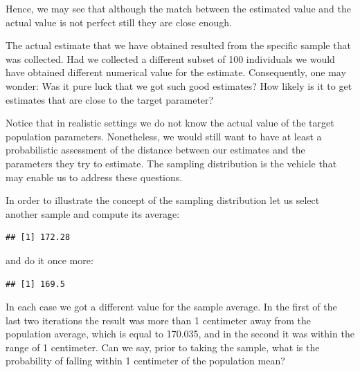 \documentclass[]{krantz}
\makeatletter
\newenvironment{Shaded}{\begin{snugshade}}{\end{snugshade}}
\newcommand{\DecValTok}[1]{\textcolor[rgb]{0.00,0.00,0.81}{#1}}
\newcommand{\FloatTok}[1]{\textcolor[rgb]{0.00,0.00,0.81}{#1}}
\newcommand{\KeywordTok}[1]{\textcolor[rgb]{0.13,0.29,0.53}{\textbf{#1}}}
\newcommand{\NormalTok}[1]{#1}
\newcommand{\OperatorTok}[1]{\textcolor[rgb]{0.81,0.36,0.00}{\textbf{#1}}}
\newcommand{\StringTok}[1]{\textcolor[rgb]{0.31,0.60,0.02}{#1}}
\newenvironment{kframe}{%
\medskip{}
\setlength{\fboxsep}{.8em}
 \def\at@end@of@kframe{}%
 \ifinner\ifhmode%
  \def\at@end@of@kframe{\end{minipage}}%
  \begin{minipage}{\columnwidth}%
 \fi\fi%
 \def\FrameCommand##1{\hskip\@totalleftmargin \hskip-\fboxsep
 \colorbox{shadecolor}{##1}\hskip-\fboxsep
     \hskip-\linewidth \hskip-\@totalleftmargin \hskip\columnwidth}%
 \MakeFramed {\advance\hsize-\width
   \@totalleftmargin\z@ \linewidth\hsize
   \@setminipage}}%
 {\par\unskip\endMakeFramed%
 \at@end@of@kframe}
\renewenvironment{Shaded}{\begin{kframe}}{\end{kframe}}
\theoremstyle{definition}
\theoremstyle{definition}
\theoremstyle{definition}
\theoremstyle{remark}
\makeatother
\begin{document}
Hence, we may see that although the match between the estimated value
and the actual value is not perfect still they are close enough.

The actual estimate that we have obtained resulted from the specific
sample that was collected. Had we collected a different subset of 100
individuals we would have obtained different numerical value for the
estimate. Consequently, one may wonder: Was it pure luck that we got
such good estimates? How likely is it to get estimates that are close to
the target parameter?

Notice that in realistic settings we do not know the actual value of the
target population parameters. Nonetheless, we would still want to have
at least a probabilistic assessment of the distance between our
estimates and the parameters they try to estimate. The sampling
distribution is the vehicle that may enable us to address these
questions.

In order to illustrate the concept of the sampling distribution let us
select another sample and compute its average:

\begin{Shaded}
\end{Shaded}

\begin{verbatim}
## [1] 172.28
\end{verbatim}

and do it once more:

\begin{Shaded}
\end{Shaded}

\begin{verbatim}
## [1] 169.5
\end{verbatim}

In each case we got a different value for the sample average. In the
first of the last two iterations the result was more than 1 centimeter
away from the population average, which is equal to 170.035, and in the
second it was within the range of 1 centimeter. Can we say, prior to
taking the sample, what is the probability of falling within 1
centimeter of the population mean?
\end{document}
